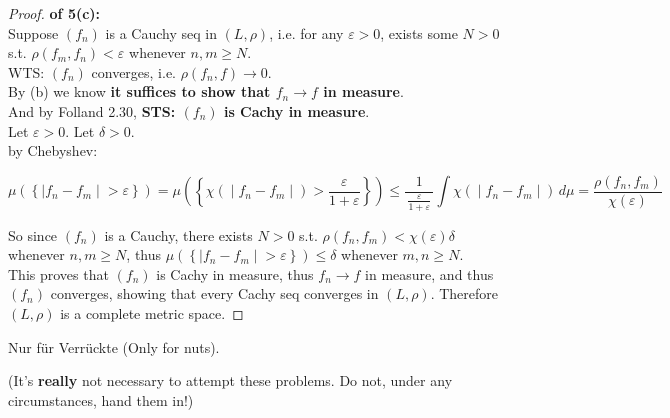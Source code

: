 \begin{proof}

\textbf{of 5(c):}\\
Suppose \((f_{n})\) is a Cauchy seq in \((L,\rho)\), i.e. for any \(\varepsilon > 0\), exists some \(N > 0\) s.t. \(\rho(f_{m},f_{n}) < \varepsilon\) whenever \(n,m \geq N\).\\
WTS: \((f_{n})\) converges, i.e. \(\rho(f_{n},f)\rightarrow 0\).\\
By (b) we know \textbf{it suffices to show that \(f_{n}\rightarrow f\) in measure}.\\
And by Folland 2.30, \textbf{STS: \((f_{n})\) is Cachy in measure}.\\
Let \(\varepsilon > 0\). Let \(\delta > 0\).\\
by Chebyshev:

\[\left. \mu(\left\{ |f_{n} - f_{m} \middle| > \varepsilon \right\}) = \mu(\left\{ \chi( \middle| f_{n} - f_{m} \middle| ) > \frac{\varepsilon}{1 + \varepsilon} \right\}) \leq \frac{1}{\,\frac{\varepsilon}{1 + \varepsilon}\,}\int\chi( \middle| f_{n} - f_{m} \middle| )\, d\mu = \frac{\rho(f_{n},f_{m})}{\chi(\varepsilon)} \right.\]

So since \((f_{n})\) is a Cauchy, there exists \(N > 0\) s.t. \(\rho(f_{n},f_{m}) < \chi(\varepsilon)\delta\) whenever \(n,m \geq N\), thus \(\mu(\left\{ |f_{n} - f_{m} \middle| > \varepsilon \right\}) \leq \delta\) whenever \(m,n \geq N\).\\
This proves that \((f_{n})\) is Cachy in measure, thus \(f_{n}\rightarrow f\) in measure, and thus \((f_{n})\) converges, showing that every Cachy seq converges in \((L,\rho)\). Therefore \((L,\rho)\) is a complete metric space.

\end{proof}

Nur für Verrückte (Only for nuts).

(It's \textbf{really} not necessary to attempt these problems. Do not, under any circumstances, hand them in!)

